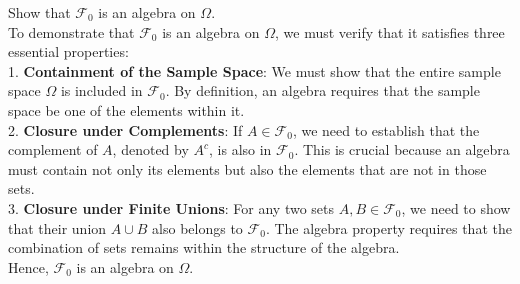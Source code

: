 \begin{example}
    Show that \(\mathcal{F}_0\) is an algebra on \(\Omega\).\\

    To demonstrate that \(\mathcal{F}_0\) is an algebra on \(\Omega\), we must verify that it satisfies three essential properties:\\

    1. \textbf{Containment of the Sample Space}: We must show that the entire sample space \(\Omega\) is included in \(\mathcal{F}_0\). By definition, an algebra requires that the sample space be one of the elements within it.\\

    2. \textbf{Closure under Complements}: If \(A \in \mathcal{F}_0\), we need to establish that the complement of \(A\), denoted by \(A^c\), is also in \(\mathcal{F}_0\). This is crucial because an algebra must contain not only its elements but also the elements that are not in those sets.\\

    3. \textbf{Closure under Finite Unions}: For any two sets \(A, B \in \mathcal{F}_0\), we need to show that their union \(A \cup B\) also belongs to \(\mathcal{F}_0\). The algebra property requires that the combination of sets remains within the structure of the algebra.\\

    Hence, \(\mathcal{F}_0\) is an algebra on \(\Omega\).\\
\end{example}

